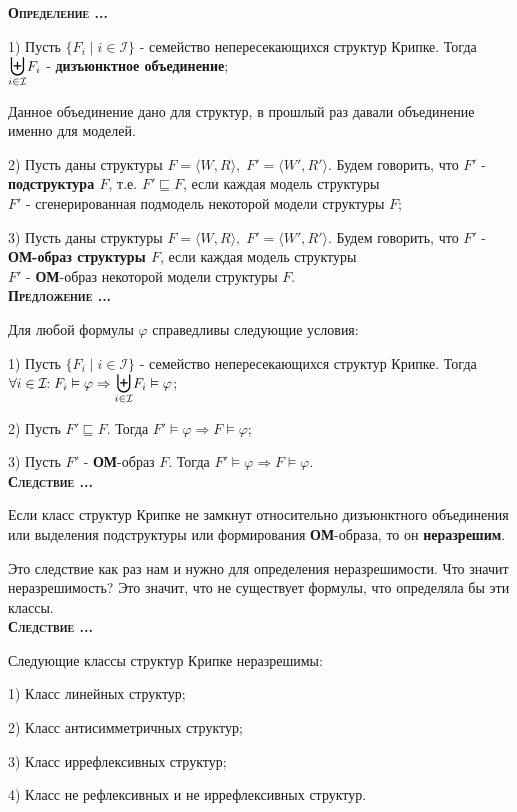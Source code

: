 \documentclass[18pt, a4paper]{extarticle}
\newcounter{par}
\newcounter{spar}
\newcounter{zap}
\newcommand{\opr}{\textbf{\textsc{Определение \thepar.\if\thespar1\thespar.\fi\thezap.\;}}\stepcounter{zap}}
\newcommand{\predl}{\textbf{\textsc{Предложение \thepar.\if\thespar1\thespar.\fi\thezap.\;}}\stepcounter{zap}}
\newcommand{\sled}{\textbf{\textsc{Следствие \thepar.\if\thespar1\thespar.\fi\thezap.\;}}\stepcounter{zap}}
\newcommand{\vp}{\varphi}
\newcommand{\vD}{\vDash}
\newcommand{\ki}{\mathcal{I}}
\newcommand{\bigs}[1]{\scalebox{1.3}{$#1$}}
\begin{document}
\opr 

1) Пусть $\{ F_i\;|\;i\in\ki\}$ - семейство непересекающихся структур Крипке. Тогда $\underset{i\in\ki}{\bigs\biguplus}F_i$ - \textbf{дизъюнктное объединение}; 

Данное объединение дано для структур, в прошлый раз давали объединение именно для моделей.

2) Пусть даны структуры $F=\langle W,R\rangle,\;F'=\langle W',R'\rangle$. Будем говорить, что $F'$ - \textbf{подструктура $F$}, т.е. $F'\sqsubseteq F$, если каждая модель структуры \\$F'$ - сгенерированная подмодель некоторой модели структуры $F$;

3) Пусть даны структуры $F=\langle W,R\rangle,\;F'=\langle W',R'\rangle$. Будем говорить, что $F'$ - \textbf{ОМ-образ структуры $F$}, если каждая модель структуры \\$F'$ - \textbf{ОМ}-образ некоторой модели структуры $F$.\\

\predl

Для любой формулы $\vp$ справедливы следующие условия:

1) Пусть $\{ F_i\;|\;i\in\ki\}$ - семейство непересекающихся структур Крипке. Тогда $\forall i\in\ki\!\!:F_i\vD\vp\Rightarrow\underset{i\in\ki}{\bigs\biguplus}F_i\vD\vp$;

2) Пусть $F'\sqsubseteq F$. Тогда $F'\vD\vp\Rightarrow F\vD\vp$;

3) Пусть $F'$ - \textbf{ОМ}-образ $F$. Тогда $F'\vD\vp\Rightarrow F\vD\vp$.\\

\sled

Если класс структур Крипке не замкнут относительно дизъюнктного объединения или выделения подструктуры или формирования \textbf{ОМ}-образа, то он \textbf{неразрешим}.

Это следствие как раз нам и нужно для определения неразрешимости. Что значит неразрешимость? Это значит, что не существует формулы, что определяла бы эти классы.\\

\sled

Следующие классы структур Крипке неразрешимы:

1) Класс линейных структур;

2) Класс антисимметричных структур;

3) Класс иррефлексивных структур;

4) Класс не рефлексивных и не иррефлексивных структур.
\end{document}
